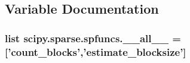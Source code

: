 \subsection{Variable Documentation}
\hypertarget{namespacescipy_1_1sparse_1_1spfuncs_ab2bb9a17cea2e9f1c8d4f5193c79cd0f}{}
\subsubsection[{\+\_\+\+\_\+all\+\_\+\+\_\+}]{\setlength{\rightskip}{0pt plus 5cm}list scipy.\+sparse.\+spfuncs.\+\_\+\+\_\+all\+\_\+\+\_\+ = \mbox{[}'{\bf count\+\_\+blocks}','{\bf estimate\+\_\+blocksize}'\mbox{]}}\label{namespacescipy_1_1sparse_1_1spfuncs_ab2bb9a17cea2e9f1c8d4f5193c79cd0f}
